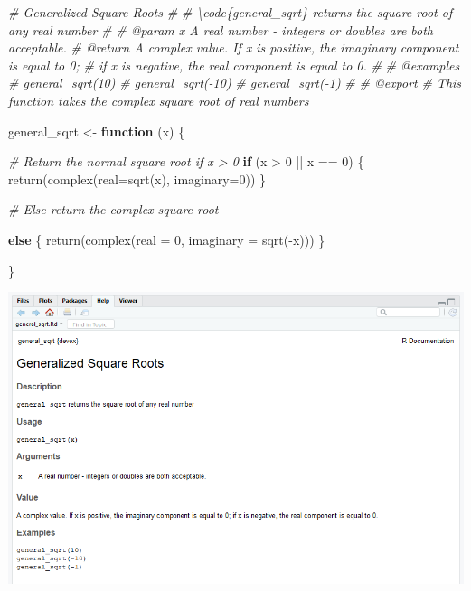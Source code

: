 \documentclass[
]{book}
\newenvironment{Shaded}{\begin{snugshade}}{\end{snugshade}}
\newcommand{\AttributeTok}[1]{\textcolor[rgb]{0.77,0.63,0.00}{#1}}
\newcommand{\CommentTok}[1]{\textcolor[rgb]{0.56,0.35,0.01}{\textit{#1}}}
\newcommand{\ControlFlowTok}[1]{\textcolor[rgb]{0.13,0.29,0.53}{\textbf{#1}}}
\newcommand{\DecValTok}[1]{\textcolor[rgb]{0.00,0.00,0.81}{#1}}
\newcommand{\FunctionTok}[1]{\textcolor[rgb]{0.00,0.00,0.00}{#1}}
\newcommand{\NormalTok}[1]{#1}
\newcommand{\OtherTok}[1]{\textcolor[rgb]{0.56,0.35,0.01}{#1}}
\newcommand{\SpecialCharTok}[1]{\textcolor[rgb]{0.00,0.00,0.00}{#1}}
\begin{document}
\begin{Shaded}
\begin{Highlighting}[]
\CommentTok{\#\textquotesingle{} Generalized Square Roots}
\CommentTok{\#\textquotesingle{}}
\CommentTok{\#\textquotesingle{} \textbackslash{}code\{general\_sqrt\} returns the square root of any real number}
\CommentTok{\#\textquotesingle{}}
\CommentTok{\#\textquotesingle{} @param x A real number {-} integers or doubles are both acceptable.}
\CommentTok{\#\textquotesingle{} @return A complex value. If x is positive, the imaginary component is equal to 0;}
\CommentTok{\#\textquotesingle{} if x is negative, the real component is equal to 0.}
\CommentTok{\#\textquotesingle{}}
\CommentTok{\#\textquotesingle{} @examples}
\CommentTok{\#\textquotesingle{} general\_sqrt(10)}
\CommentTok{\#\textquotesingle{} general\_sqrt({-}10)}
\CommentTok{\#\textquotesingle{} general\_sqrt({-}1)}
\CommentTok{\#\textquotesingle{}}
\CommentTok{\#\textquotesingle{} @export}
\CommentTok{\# This function takes the complex square root of real numbers}

\NormalTok{general\_sqrt }\OtherTok{\textless{}{-}} \ControlFlowTok{function}\NormalTok{ (x) \{}

  \CommentTok{\# Return the normal square root if x \textgreater{} 0}
  \ControlFlowTok{if}\NormalTok{ (x }\SpecialCharTok{\textgreater{}} \DecValTok{0} \SpecialCharTok{||}\NormalTok{ x }\SpecialCharTok{==} \DecValTok{0}\NormalTok{) \{}
    \FunctionTok{return}\NormalTok{(}\FunctionTok{complex}\NormalTok{(}\AttributeTok{real=}\FunctionTok{sqrt}\NormalTok{(x), }\AttributeTok{imaginary=}\DecValTok{0}\NormalTok{))}
\NormalTok{  \}}

  \CommentTok{\# Else return the complex square root}

  \ControlFlowTok{else}\NormalTok{ \{}
    \FunctionTok{return}\NormalTok{(}\FunctionTok{complex}\NormalTok{(}\AttributeTok{real =} \DecValTok{0}\NormalTok{, }\AttributeTok{imaginary =} \FunctionTok{sqrt}\NormalTok{(}\SpecialCharTok{{-}}\NormalTok{x)))}
\NormalTok{  \}}

\NormalTok{\}}
\end{Highlighting}
\end{Shaded}

\includegraphics{images/packageSS/gensqrtdoc.PNG}
\end{document}
